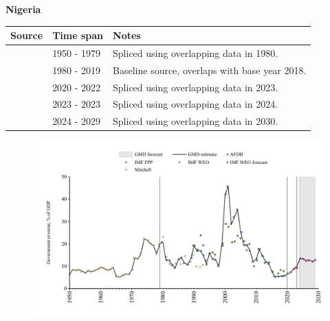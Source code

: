 \documentclass[12pt,a4paper,landscape]{article}
\begin{document}
\begin{adjustbox}{max totalsize={\paperwidth}{\paperheight},center}
\begin{minipage}[t][\textheight][t]{\textwidth}
\vspace*{0.5cm}
{}
\begin{center}
{\Large\bfseries Nigeria}
\end{center}
\vspace{0.5cm}
\begin{table}[H]
\centering
\small
\begin{tabular}{|l|l|l|}
\hline
\textbf{Source} & \textbf{Time span} & \textbf{Notes} \\
\hline
\rowcolor{white}\cite{Mitchell}& 1950 - 1979 &Spliced using overlapping data in 1980.\\
\rowcolor{lightgray}\cite{AFDB}& 1980 - 2019 &Baseline source, overlaps with base year 2018.\\
\rowcolor{white}\cite{IMF_WEO}& 2020 - 2022 &Spliced using overlapping data in 2023.\\
\rowcolor{lightgray}\cite{IMF_FPP}& 2023 - 2023 &Spliced using overlapping data in 2024.\\
\rowcolor{white}\cite{IMF_WEO_forecast}& 2024 - 2029 &Spliced using overlapping data in 2030.\\
\hline
\end{tabular}
\end{table}
\begin{figure}[H]
\centering
\includegraphics[width=\textwidth,height=0.6\textheight,keepaspectratio]{graphs/NGA_govrev_GDP.pdf}
\end{figure}
\end{minipage}
\end{adjustbox}
\end{document}
